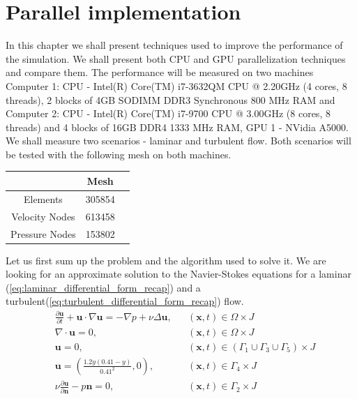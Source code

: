 \chapter{Parallel implementation}\label{ch:implementation-details}
In this chapter we shall present techniques used to improve the performance of the simulation. We shall present both CPU and GPU parallelization techniques and compare them. The performance will be measured on two machines Computer 1: CPU - Intel(R) Core(TM) i7-3632QM CPU @ 2.20GHz (4 cores, 8 threads), 2 blocks of 4GB SODIMM DDR3 Synchronous 800 MHz RAM and Computer 2: CPU - Intel(R) Core(TM) i7-9700 CPU @ 3.00GHz (8 cores, 8 threads) and 4 blocks of 16GB DDR4 1333 MHz RAM, GPU 1 - NVidia A5000. We shall measure two scenarios - laminar and turbulent flow. Both scenarios will be tested with the following mesh on both machines.

\begin{table}[H]
\centering
\begin{tabular}{|c|r|r|}
\hline
\multicolumn{1}{|l|}{} & \multicolumn{1}{c|}{Mesh} \\ \hline
Elements               & 305854                      \\ \hline
Velocity Nodes         & 613458                      \\ \hline
Pressure Nodes         & 153802                      \\ \hline
\end{tabular}
\end{table}

Let us first sum up the problem and the algorithm used to solve it. We are looking for an approximate solution to the Navier-Stokes equations for a laminar (\cref{eq:laminar_differential_form_recap}) and a turbulent(\cref{eq:turbulent_differential_form_recap}) flow.
\begin{equation}\label{eq:laminar_differential_form_recap}
\begin{aligned}
  &\frac{\partial\mathbf{u}}{\partial t} + \mathbf{u} \cdot \nabla\mathbf{u} = -\nabla p + \nu\Delta\mathbf{u}, &&\left(\mathbf{x}, t\right) \in \Omega \times J \\
  &\nabla \cdot \mathbf{u} = 0, &&\left(\mathbf{x}, t\right) \in \Omega \times J \\
  &\mathbf{u} = 0, &&\left(\mathbf{x}, t\right) \in \left(\Gamma_1 \cup \Gamma_3 \cup \Gamma_5\right) \times J \\
  &\mathbf{u} = \left(\frac{1.2y\left(0.41 - y\right)}{0.41^2}, 0\right), &&\left(\mathbf{x}, t\right) \in \Gamma_4 \times J \\
  &\nu\frac{\partial\mathbf{u}}{\partial\mathbf{n}} - p\mathbf{n} = 0, &&\left(\mathbf{x}, t\right) \in \Gamma_2 \times J \\
\end{aligned}
\end{equation}

